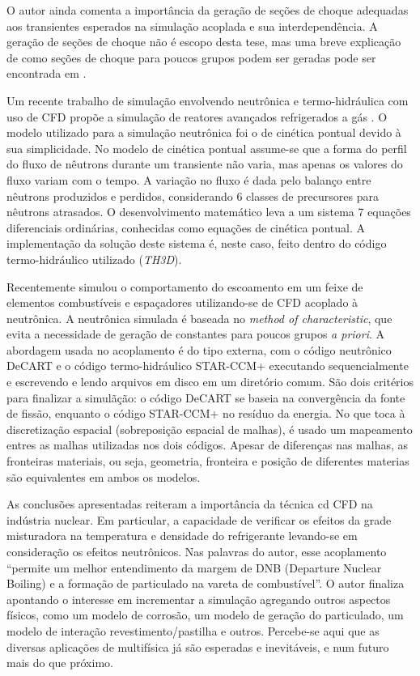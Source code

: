 \documentclass[12pt,openright,twoside,a4paper,english,french,spanish,brazil]{abntex2}
\begin{document}
O autor ainda comenta a importância da geração de seções de choque adequadas aos transientes esperados na 
simulação acoplada e sua interdependência. A geração de seções de choque não é escopo desta tese, mas uma 
breve explicação de como seções de choque para poucos grupos podem ser geradas pode ser encontrada 
em \cite{Friedman2013}.

Um recente trabalho de simulação envolvendo neutrônica e termo-hidráulica com uso de CFD propõe 
a simulação de reatores avançados refrigerados a gás \cite{Hossain2011}. O modelo utilizado 
para a simulação neutrônica foi o de cinética pontual devido à sua simplicidade. No modelo 
de cinética pontual assume-se que a forma do perfil do fluxo de nêutrons durante um transiente 
não varia, mas apenas os valores do fluxo variam com o tempo. A variação no fluxo é dada 
pelo balanço entre nêutrons produzidos e perdidos, considerando 6 classes de precursores 
para nêutrons atrasados. O desenvolvimento matemático leva a um sistema 7 equações diferenciais 
ordinárias, conhecidas como equações de cinética pontual. A implementação da solução deste sistema 
é, neste caso, feito dentro do código termo-hidráulico utilizado (\textit{TH3D}).

Recentemente \cite{Yan2011} simulou o comportamento do escoamento em um feixe de elementos 
combustíveis e espaçadores utilizando-se de CFD acoplado à neutrônica. A neutrônica 
simulada é baseada no \textit{method of characteristic}, que evita a necessidade de geração 
de constantes para poucos grupos \textit{a priori}. A abordagem usada no 
acoplamento é do tipo externa, com o código neutrônico DeCART e o código termo-hidráulico 
STAR-CCM+ executando sequencialmente e escrevendo e lendo arquivos em disco em um 
diretório comum. São dois critérios para finalizar a simulãção: o código DeCART se baseia 
na convergência da fonte de fissão, enquanto o código STAR-CCM+ no resíduo da energia. No que toca à 
discretização espacial (sobreposição espacial de malhas), é usado um mapeamento entres as malhas 
utilizadas nos dois códigos. Apesar de diferenças nas malhas, as fronteiras materiais, ou seja, geometria, 
fronteira e posição de diferentes materias são equivalentes em ambos os modelos.

As conclusões apresentadas reiteram a importância da técnica cd CFD na indústria nuclear. Em particular, 
a capacidade de verificar os efeitos da grade misturadora na temperatura e densidade do refrigerante 
levando-se em consideração os efeitos neutrônicos. Nas palavras do autor, esse acoplamento 
``permite um melhor entendimento da margem de DNB (Departure Nuclear Boiling) e a formação de particulado 
na vareta de combustível''. O autor finaliza apontando o interesse em incrementar a simulação 
agregando outros aspectos físicos, como um modelo de corrosão, um modelo de geração do particulado, 
um modelo de interação revestimento/pastilha e outros. Percebe-se aqui que as diversas aplicações 
de multifísica já são esperadas e inevitáveis, e num futuro mais do que próximo.
\end{document}
